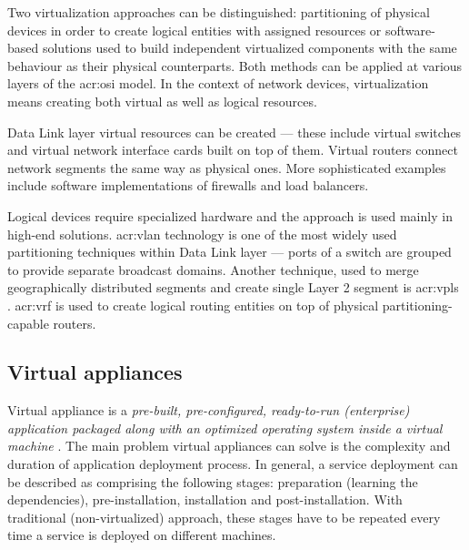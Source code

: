 \documentclass[11pt]{book}
\begin{document}
        Two virtualization approaches can be distinguished: partitioning of physical devices in order to create logical
        entities with assigned resources or software-based solutions used to build independent virtualized components
        with the same behaviour as their physical counterparts. Both methods can be applied at various layers of the
        \gls{acr:osi} model. In the context of network devices, virtualization means creating both virtual as well as
        logical resources.

        Data Link layer virtual resources can be created --- these include virtual switches and virtual network
        interface cards built on top of them. Virtual routers connect network segments the same way as physical ones.
        More sophisticated examples include software implementations of firewalls and load balancers.

        Logical devices require specialized hardware and the approach is used mainly in high-end solutions.
        \gls{acr:vlan} technology is one of the most widely used partitioning techniques within Data Link layer ---
        ports of a switch are grouped to provide separate broadcast domains. Another technique, used to merge
        geographically distributed segments and create single Layer 2 segment is \gls{acr:vpls} \cite{moreno}.
        \gls{acr:vrf} is used to create logical routing entities on top of physical partitioning-capable routers.




      \subsection{Virtual appliances}
      \label{sub:}



        Virtual appliance is a \textit{pre-built, pre-configured, ready-to-run (enterprise) application packaged along
        with an optimized operating system inside a virtual machine} \cite{changhua}. The main problem virtual
        appliances can solve is the complexity and duration of application deployment process.  In general, a service
        deployment can be described as comprising the following stages: preparation (learning the dependencies),
        pre-installation, installation and post-installation. With traditional (non-virtualized) approach, these stages
        have to be repeated every time a service is deployed on different machines.
\end{document}
